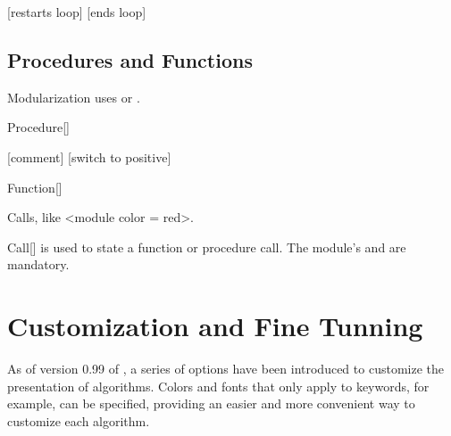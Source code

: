 \documentclass[a4paper, 11pt]{article}
\begin{document}
\begin{tcblisting}{}
    \begin{algorithmic}
        \Loop
                \Statep{\Continue}[restarts loop]
            \EndIf
                \Statep{\Break}[ends loop]
            \EndIf
        \EndLoop
    \end{algorithmic}
\end{tcblisting}

\subsection{Procedures and Functions}\label{sec:procedures-and-functions}
Modularization uses  or .

\begin{macro}{Procedure}[{}]
\end{macro}

\begin{tcblisting}{}
    \begin{algorithmic}
        [comment]
            \Else
                [switch to positive]
            \EndIf

        \EndProcedure
    \end{algorithmic}
\end{tcblisting}

\begin{macro}{Function}[{}]
\end{macro}

Calls, like <module color = red>.

\begin{macro}{Call}[]
    \label{call}
     is used to state a function or procedure call. The module's  and  are mandatory.

    \MacroOptionsText
\end{macro}


\section{Customization and Fine Tunning}\label{sec:customization-and-fine-tunning}
As of version 0.99 of , a series of options have been introduced to customize the presentation of algorithms. Colors and fonts that only apply to keywords, for example, can be specified, providing an easier and more convenient way to customize each algorithm.
\end{document}
